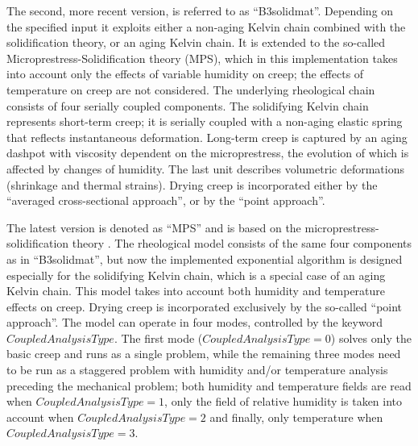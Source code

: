 \documentclass[a4paper]{article}
\begin{document}
The second, more recent version, is referred to as ``B3solidmat''. Depending on the specified input it exploits either a non-aging Kelvin chain combined with the solidification theory, or an aging Kelvin chain. It is extended to the so-called Microprestress-Solidification theory (MPS), which in this implementation  takes into account only the effects of variable humidity on creep; the effects of temperature on creep are not considered. 
The underlying rheological chain consists of four serially coupled components. The solidifying Kelvin chain represents short-term creep; it is serially coupled with a non-aging elastic spring that reflects instantaneous deformation. Long-term creep is captured by an aging dashpot with viscosity dependent on the microprestress, the evolution of which is affected by changes of humidity. The last  unit describes volumetric deformations (shrinkage and thermal strains).
Drying creep is incorporated either by the 
``averaged cross-sectional approach'', or by the ``point approach''.

The latest version is denoted as ``MPS'' and is based on the microprestress-solidification theory \cite{Bazant-89-I} \cite{Bazant-97-I} \cite{JirHav14a}. The rheological model consists of the same four components as in  ``B3solidmat'', but now the implemented exponential algorithm is designed especially for the solidifying Kelvin chain, which is a special case of an aging Kelvin chain. This model takes into account both humidity and temperature effects on creep. Drying creep is incorporated exclusively by the so-called
``point approach''. The model can operate in four modes,
controlled by the keyword $CoupledAnalysisType$. The first mode ($CoupledAnalysisType = 0$) solves only the basic creep and runs as a single problem, while the remaining three modes need to be run as a staggered problem with humidity and/or temperature analysis preceding the mechanical problem; both humidity and temperature fields are read when $CoupledAnalysisType = 1$, only the field of relative humidity is taken into account when $CoupledAnalysisType = 2$ and finally, only temperature when $CoupledAnalysisType = 3$.
\end{document}
